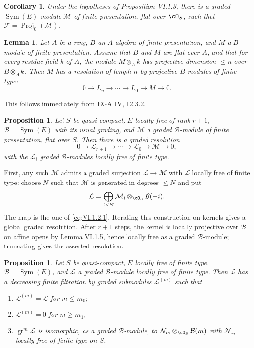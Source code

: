 \documentclass[11pt]{article}
\theoremstyle{plain}
\newtheorem{proposition}[theorem]{Proposition}
\newtheorem{lemma}[theorem]{Lemma}
\newtheorem{corollary}[theorem]{Corollary}
\theoremstyle{definition}
\theoremstyle{remark}
\DeclareMathOperator{\Proj}{Proj}
\DeclareMathOperator{\gr}{gr}
\providecommand{\Sym}{\operatorname{Sym}}
\begin{document}
\begin{corollary}\label{cor:VI.1.4}
Under the hypotheses of Proposition VI.1.3, there is a graded $\Sym(E)$-module $\mathcal M$ of finite presentation, flat over $\cO_S$, such that $\mathcal F=\Proj_0(\mathcal M)$.
\end{corollary}

\begin{lemma}\label{lem:VI.1.5}
Let $A$ be a ring, $B$ an $A$-algebra of finite presentation, and $M$ a $B$-module of finite presentation. Assume that $B$ and $M$ are flat over $A$, and that for every residue field $k$ of $A$, the module $M\otimes_Ak$ has projective dimension $\leq n$ over $B\otimes_Ak$. Then $M$ has a resolution of length $n$ by projective $B$-modules of finite type:
\[
0\to L_n\to\cdots\to L_0\to M\to 0.
\]
\end{lemma}
This follows immediately from EGA IV, 12.3.2.

\begin{proposition}\label{prop:VI.1.6}
Let $S$ be quasi-compact, $E$ locally free of rank $r+1$, $\mathcal B=\Sym(E)$ with its usual grading, and $\mathcal M$ a graded $\mathcal B$-module of finite presentation, flat over $S$. Then there is a graded resolution
\[
0\to\mathcal L_{r+1}\to\cdots\to\mathcal L_0\to\mathcal M\to 0,
\]
with the $\mathcal L_i$ graded $\mathcal B$-modules locally free of finite type.
\end{proposition}

First, any such $\mathcal M$ admits a graded surjection $\mathcal L\to\mathcal M$ with $\mathcal L$ locally free of finite type: choose $N$ such that $\mathcal M$ is generated in degrees $\leq N$ and put
\[
\mathcal L=\bigoplus_{i\leq N}\mathcal M_i\otimes_{\cO_S}\mathcal B(-i).
\]
The map is the one of \eqref{eq:VI.1.2.1}. Iterating this construction on kernels gives a global graded resolution. After $r+1$ steps, the kernel is locally projective over $\mathcal B$ on affine opens by Lemma VI.1.5, hence locally free as a graded $\mathcal B$-module; truncating gives the asserted resolution.

\begin{proposition}\label{prop:VI.1.7}
Let $S$ be quasi-compact, $E$ locally free of finite type, $\mathcal B=\Sym(E)$, and $\mathcal L$ a graded $\mathcal B$-module locally free of finite type. Then $\mathcal L$ has a decreasing finite filtration by graded submodules $\mathcal L^{(m)}$ such that
\begin{enumerate}[label=(\roman*)]
\item $\mathcal L^{(m)}=\mathcal L$ for $m\leq m_0$;
\item $\mathcal L^{(m)}=0$ for $m\geq m_1$;
\item $\gr^m\mathcal L$ is isomorphic, as a graded $\mathcal B$-module, to $\mathcal N_m\otimes_{\cO_S}\mathcal B(m)$ with $\mathcal N_m$ locally free of finite type on $S$.
\end{enumerate}
\end{proposition}
\end{document}
